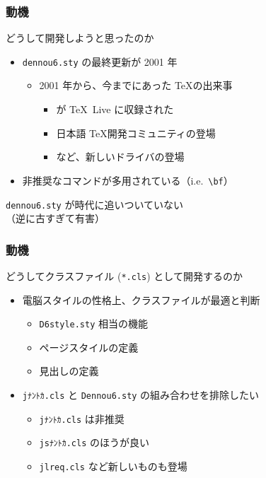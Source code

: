 \documentclass[unicode,12pt,colorlinks,]{beamer}
\begin{document}
\begin{frame}[fragile]
	\frametitle{動機}
	\begin{block}{どうして開発しようと思ったのか}
		\begin{itemize}
			\item \texttt{dennou6.sty} の最終更新が 2001 年
				\begin{itemize}
				\item 2001 年から、今までにあった \TeX の出来事
					\begin{itemize}
						\item \pTeX が \TeX\ Live に収録された
						\item 日本語 \TeX 開発コミュニティの登場
						\item \LuaTeX など、新しいドライバの登場
					\end{itemize}
				\end{itemize}
			\item 非推奨なコマンドが多用されている（i.e.\ \verb|\bf|）
		\end{itemize}

		\texttt{dennou6.sty} が時代に追いついていない\\
		（逆に古すぎて有害）
	\end{block}
\end{frame}

\begin{frame}
	\frametitle{動機}
	\begin{block}{どうしてクラスファイル (\texttt{*.cls}) として開発するのか}
		\begin{itemize}
			\item 電脳スタイルの性格上、クラスファイルが最適と判断
				\begin{itemize}
					\item \texttt{D6style.sty} 相当の機能
					\item ページスタイルの定義
					\item 見出しの定義
				\end{itemize}
			\item \texttt{jﾅﾝﾄｶ.cls} と \texttt{Dennou6.sty} の組み合わせを排除したい
				\begin{itemize}
					\item \texttt{jﾅﾝﾄｶ.cls} は非推奨
					\item \texttt{jsﾅﾝﾄｶ.cls} のほうが良い
					\item \texttt{jlreq.cls} など新しいものも登場
				\end{itemize}
		\end{itemize}
	\end{block}
\end{frame}
\end{document}
